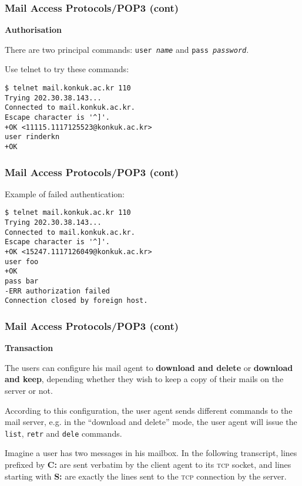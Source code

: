 %
\begin{frame}[containsverbatim]
\frametitle{Mail Access Protocols/POP3 (cont)}

\textbf{Authorisation}

There are two principal commands: \texttt{user \emph{name}} and
\texttt{pass \emph{password}}.

Use \textsf{telnet} to try these commands:

{\small
\begin{verbatim}
$ telnet mail.konkuk.ac.kr 110
Trying 202.30.38.143...
Connected to mail.konkuk.ac.kr.
Escape character is '^]'.
+OK <11115.1117125523@konkuk.ac.kr>
user rinderkn
+OK 
\end{verbatim}
}

\end{frame}

%
\begin{frame}[containsverbatim]
\frametitle{Mail Access Protocols/POP3 (cont)}

Example of failed authentication:
{\small 
\begin{verbatim}
$ telnet mail.konkuk.ac.kr 110
Trying 202.30.38.143...
Connected to mail.konkuk.ac.kr.
Escape character is '^]'.
+OK <15247.1117126049@konkuk.ac.kr>
user foo 
+OK 
pass bar
-ERR authorization failed
Connection closed by foreign host.
\end{verbatim}
}

\end{frame}

%
\begin{frame}
\frametitle{Mail Access Protocols/POP3 (cont)}

\textbf{Transaction}

The users can configure his mail agent to \textbf{download and delete}
or \textbf{download and keep}, depending whether they wish to keep a
copy of their mails on the server or not.

According to this configuration, the user agent sends different
commands to the mail server, e.g. in the ``download and delete'' mode,
the user agent will issue the \texttt{list}, \texttt{retr} and
\texttt{dele} commands.

Imagine a user has two messages in his mailbox. In the following
transcript, lines prefixed by \textbf{C:} are sent verbatim by the
client agent to its \textsc{tcp} socket, and lines starting with
\textbf{S:} are exactly the lines sent to the \textsc{tcp} connection
by the server. 

\end{frame}


